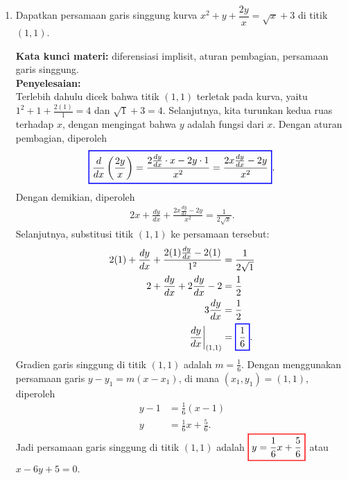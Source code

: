 \documentclass[10pt,openany,a4paper]{article}
\theoremstyle{definition}
\theoremstyle{definition}
\theoremstyle{plain}
\newenvironment{jawab}[2][tes]{%
\par\noindent\textbf{Kata kunci materi:} #1.\\
\textbf{Penyelesaian:} #2%
}{}
\begin{document}
\begin{enumerate}
    \item Dapatkan persamaan garis singgung kurva $x^2+y+\dfrac{2y}{x}=\sqrt{x}+3$ di titik $(1,1)$.
    \begin{jawab}[diferensiasi implisit, aturan pembagian, persamaan garis singgung]{~\\
        Terlebih dahulu dicek bahwa titik $(1,1)$ terletak pada kurva, yaitu $1^2+1+\frac{2(1)}{1}=4$ dan $\sqrt{1}+3=4$. Selanjutnya, kita turunkan kedua ruas terhadap $x$, dengan mengingat bahwa $y$ adalah fungsi dari $x$. Dengan aturan pembagian, diperoleh
        \begin{align*}
            \colorlet{oldcolor}{.}
        \color{blue}
        \setlength{\fboxrule}{1pt} \boxed{\color{oldcolor}\frac{d}{dx}\left(\frac{2y}{x}\right) = \frac{2\frac{dy}{dx}\cdot x - 2y\cdot 1}{x^2} = \frac{2x\frac{dy}{dx} - 2y}{x^2}}\color{oldcolor}.
        \end{align*}
        Dengan demikian, diperoleh
        \begin{align*}
            2x + \frac{dy}{dx} + \frac{2x\frac{dy}{dx} - 2y}{x^2} = \frac{1}{2\sqrt{x}}.
        \end{align*}
        Selanjutnya, substitusi titik $(1,1)$ ke persamaan tersebut:
        \begin{align*}
            2(1) + \frac{dy}{dx} + \frac{2(1)\frac{dy}{dx} - 2(1)}{1^2} &= \frac{1}{2\sqrt{1}}\\
            2 + \frac{dy}{dx} + 2\frac{dy}{dx} - 2 &= \frac{1}{2}\\
            3\frac{dy}{dx} &= \frac{1}{2}\\
            \frac{dy}{dx}\bigg|_{(1,1)} &= \colorlet{oldcolor}{.}
        \color{blue}
        \setlength{\fboxrule}{1pt} \boxed{\color{oldcolor}\frac{1}{6}}\color{oldcolor}.
        \end{align*}
        Gradien garis singgung di titik $(1,1)$ adalah $m=\frac{1}{6}$. Dengan menggunakan persamaan garis $y - y_1 = m(x - x_1)$, di mana $(x_1,y_1)=(1,1)$, diperoleh
        \begin{align*}
            y - 1 &= \frac{1}{6}(x - 1)\\
            y &= \frac{1}{6}x + \frac{5}{6}.
        \end{align*}
        Jadi persamaan garis singgung di titik $(1,1)$ adalah $\colorlet{oldcolor}{.}
        \color{red}
        \setlength{\fboxrule}{1pt} \boxed{\color{oldcolor}y = \frac{1}{6}x + \frac{5}{6}}\color{oldcolor}$ atau $x-6y+5=0$.
    }
    \end{jawab}
\end{enumerate}
\end{document}
